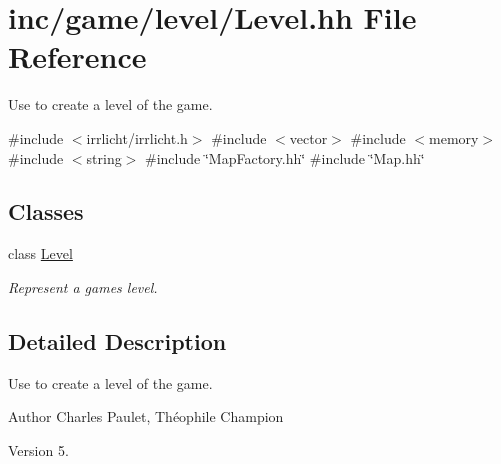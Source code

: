 \hypertarget{Level_8hh}{}\section{inc/game/level/\+Level.hh File Reference}
\label{Level_8hh}


Use to create a level of the game.  


{\ttfamily \#include $<$irrlicht/irrlicht.\+h$>$}\newline
{\ttfamily \#include $<$vector$>$}\newline
{\ttfamily \#include $<$memory$>$}\newline
{\ttfamily \#include $<$string$>$}\newline
{\ttfamily \#include \char`\"{}Map\+Factory.\+hh\char`\"{}}\newline
{\ttfamily \#include \char`\"{}Map.\+hh\char`\"{}}\newline
\subsection*{Classes}
\begin{DoxyCompactItemize}
\item 
class \hyperlink{classLevel}{Level}
\begin{DoxyCompactList}\small\item\em Represent a game\textquotesingle{}s level. \end{DoxyCompactList}\end{DoxyCompactItemize}


\subsection{Detailed Description}
Use to create a level of the game. 

\begin{DoxyAuthor}{Author}
Charles Paulet, Théophile Champion 
\end{DoxyAuthor}
\begin{DoxyVersion}{Version}
5. 
\end{DoxyVersion}
